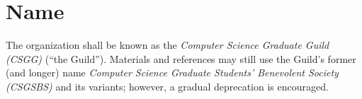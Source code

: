 \section{Name}

The organization shall be known as the \textit{Computer Science Graduate Guild
    (CSGG)} (``the Guild''). Materials and references may still use the Guild's
former (and longer) name \textit{Computer Science Graduate Students’ Benevolent
    Society (CSGSBS)} and its variants; however, a gradual deprecation is
encouraged.